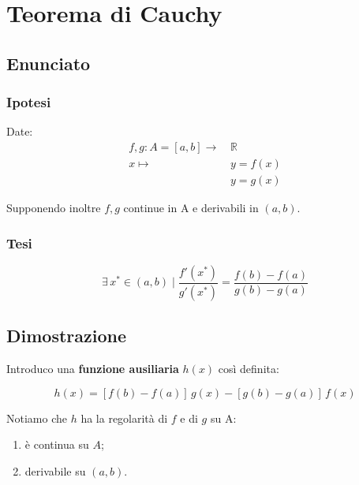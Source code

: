 \documentclass[../../dimostrazioni]{subfiles}
\begin{document}
    \chapter{Teorema di Cauchy}
    \label{teoCauchy}

        \section*{Enunciato}

            \subsection*{Ipotesi}

                Date:
                \begin{align*}
                    f,g : A = [a, b] \longrightarrow \, &\mathbb{R}\\
                    x \longmapsto \, &y = f(x)\\
                                  &y = g(x) 
                \end{align*}

                Supponendo inoltre \(f, g\) continue in A e derivabili in \( (a,b) \).

            \subsection*{Tesi}

                \[ 
                    \exists \, x^* \in (a,b) \mid \frac{ f'(x^*) }{ g'(x^*) } = \frac{ f(b) - f(a) }{ g(b) - g(a) }
                \]

        \section*{Dimostrazione}

            Introduco una \textbf{funzione ausiliaria} \(h(x)\) così definita:

            \[ 
                h(x) = \left[f(b) - f(a)\right] \, g(x) - \left[g(b) - g(a)\right] \, f(x)
            \]

            Notiamo che \(h\) ha la regolarità di \(f\) e di \(g\) su A:
            \begin{enumerate}
                \indentitem \item è continua su \( A \);
                \indentitem \item derivabile su \( (a, b) \).
            \end{enumerate}
\end{document}
